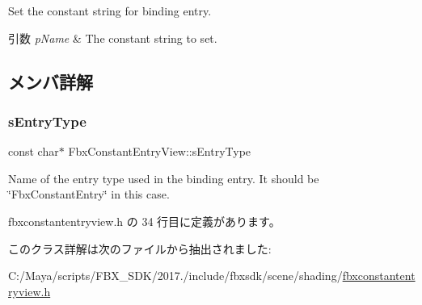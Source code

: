 Set the constant string for binding entry. 
\begin{DoxyParams}{引数}
{\em p\+Name} & The constant string to set. \\
\hline
\end{DoxyParams}


\subsection{メンバ詳解}
\mbox{\label{class_fbx_constant_entry_view_a9613da66bae01aaedaf6a08f6f538126}} 
\subsubsection{\texorpdfstring{s\+Entry\+Type}{sEntryType}}
{\footnotesize\ttfamily const char$\ast$ Fbx\+Constant\+Entry\+View\+::s\+Entry\+Type\hspace{0.3cm}{\ttfamily [static]}}

Name of the entry type used in the binding entry. It should be \char`\"{}\+Fbx\+Constant\+Entry\char`\"{} in this case. 

 fbxconstantentryview.\+h の 34 行目に定義があります。



このクラス詳解は次のファイルから抽出されました\+:\begin{DoxyCompactItemize}
\item 
C\+:/\+Maya/scripts/\+F\+B\+X\+\_\+\+S\+D\+K/2017./include/fbxsdk/scene/shading/\hyperlink{fbxconstantentryview_8h}{fbxconstantentryview.\+h}\end{DoxyCompactItemize}
